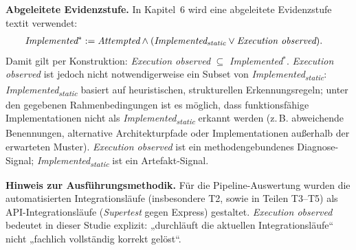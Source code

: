 \noindent \textbf{Abgeleitete Evidenzstufe.} In Kapitel~6 wird eine abgeleitete Evidenzstufe\\
\csname textit verwendet:
\EndAccSupp{}
\[
\begin{aligned}
    \csname textit\endcsname{Implemented$^\ast$} &:=  \textit{Attempted} \wedge (\textit{Implemented\textsubscript{static}} \vee  \textit{Execution observed}).
\end{aligned}
\]
Damit gilt per Konstruktion:  \textit{Execution observed} $\subseteq$  \textit{Implemented$^\ast$}.  \textit{Execution observed} ist jedoch nicht notwendigerweise ein Subset von  \textit{Implemented\textsubscript{static}}:  \textit{Implemented\textsubscript{static}} basiert auf heuristischen, strukturellen Erkennungsregeln; unter den gegebenen Rahmenbedingungen ist es möglich, dass funktionsfähige Implementationen nicht als  \textit{Implemented\textsubscript{static}} erkannt werden (z.\,B. abweichende Benennungen, alternative Architekturpfade oder Implementationen außerhalb der erwarteten Muster).  \textit{Execution observed} ist ein methodengebundenes Diagnose-Signal;  \textit{Implemented\textsubscript{static}} ist ein Artefakt-Signal.

\noindent \textbf{Hinweis zur Ausführungsmethodik.} Für die Pipeline-Auswertung wurden die automatisierten Integrationsläufe (insbesondere T2, sowie in Teilen T3--T5) als API-Integrationsläufe (\textit{Supertest} gegen Express) gestaltet. \textit{Execution observed} bedeutet in dieser Studie explizit: „durchläuft die aktuellen Integrationsläufe“ \textendash{} nicht „fachlich vollständig korrekt gelöst“.

